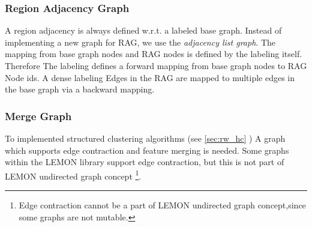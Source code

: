 \subsubsection{Region Adjacency Graph} \label{sec:graphs_rag}

A region adjacency is always defined w.r.t. a labeled base graph.
Instead of implementing a new graph for RAG, we use
the \emph{adjacency list graph}.
The mapping from base graph nodes and RAG nodes  is defined
by the labeling itself. Therefore
The labeling defines a forward mapping from base graph nodes
to RAG Node ids.
A dense labeling 
Edges in the RAG are mapped to multiple edges in the base graph
via a backward mapping.




\subsubsection{Merge Graph} \label{sec:graphs_merge_graph}

To implemented structured clustering algorithms (see \cref{sec:rw_hc} ) 
A graph which supports edge contraction and feature merging is needed.
Some graphs within the LEMON library support 
edge contraction, but this is not part of LEMON undirected graph concept \footnote{
Edge contraction cannot be a part of LEMON undirected graph concept,since some graphs
are not mutable.}.

